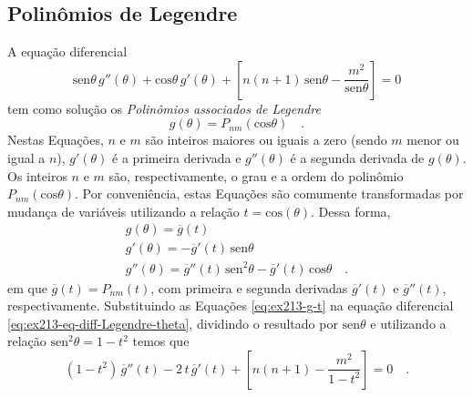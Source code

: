 \documentclass[10pt,a4paper,fleqn]{article}
\begin{document}
\begin{flushleft}
\dotfill
\end{flushleft}

\subsection{Polin\^{o}mios de Legendre}

A equa\c{c}\~{a}o diferencial
\begin{equation}
\text{sen} \theta \, g''(\theta) + 
\text{cos} \theta \, g'(\theta) + 
\left[ n(n+1) \, \text{sen} \theta - \dfrac{m^{2}}{\text{sen} \theta} \right] = 0
\label{eq:ex213-eq-diff-Legendre-theta}
\end{equation}
tem como solu\c{c}\~{a}o os \textit{Polin\^{o}mios associados de Legendre}
\begin{equation}
g(\theta) = P_{nm}(\text{cos}\theta) \quad .
\label{eq:ex213-g-theta}
\end{equation}
Nestas Equa\c{c}\~{o}es, $n$ e $m$ s\~{a}o inteiros maiores ou iguais a zero (sendo $m$ menor ou igual a $n$), 
$g'(\theta)$ \'{e} a primeira derivada e $g''(\theta)$ \'{e} a segunda derivada de $g(\theta)$. Os inteiros $n$ 
e $m$ s\~{a}o, respectivamente, o grau e a ordem do polin\^{o}mio $P_{nm}(\text{cos}\theta)$. Por conveni\^{e}ncia, 
estas Equa\c{c}\~{o}es s\~{a}o comumente transformadas por mudan\c{c}a de vari\'{a}veis  utilizando a rela\c{c}\~{a}o 
$t = \text{cos}(\theta)$. Dessa forma,
\begin{equation}
\begin{array}{l}
g(\theta) = \overline{g}(t) \\
g'(\theta) = -\overline{g}'(t) \, \text{sen} \theta \\
g''(\theta) = \overline{g}''(t) \, \text{sen}^{2} \theta - \overline{g}'(t) \, \text{cos} \theta \quad .
\end{array}
\label{eq:ex213-g-t}
\end{equation}
em que $\overline{g}(t) = P_{nm}(t)$, com primeira e segunda derivadas $\overline{g}'(t)$ e $\overline{g}''(t)$, 
respectivamente. Substituindo as Equa\c{c}\~{o}es \ref{eq:ex213-g-t} na equa\c{c}\~{a}o diferencial 
\ref{eq:ex213-eq-diff-Legendre-theta}, dividindo o resultado por $\text{sen} \theta$ e utilizando a rela\c{c}\~{a}o $\text{sen}^{2} 
\theta = 1 - t^2$ temos que
\begin{equation}
(1 - t^2) \, \overline{g}''(t) - 2 \, t \, \overline{g}'(t) +
\left[ n(n+1) - \frac{m^{2}}{1 - t^2} \right] = 0 \quad .
\label{eq:ex213-eq-diff-Legendre-t}
\end{equation}
\end{document}
